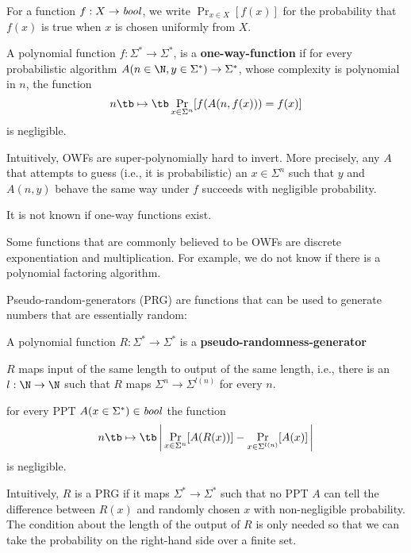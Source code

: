 \newcommand{\Prob}[2]{\mathop{\mathrm{Pr}}_{#1}[#2]}

\begin{notation}
For a function $f:X\to\mathit{bool}$, we write $\Prob{x\in X}{f(x)}$ for the probability that $f(x)$ is true when $x$ is chosen uniformly from $X$.
\end{notation}

\begin{definition}
 A polynomial function $f:\Sigma^*\to \Sigma^*$, is a \textbf{one-way-function} if for every probabilistic algorithm $A(n\in\N,y\in \Sigma^*)\to\Sigma^*$, whose complexity is polynomial in $n$, the function
 \[n\tb\mapsto\tb \Prob{x\in\Sigma^n}{f(A(n,f(x)))=f(x)}\]
 is negligible.
\end{definition}
Intuitively, OWFs are super-polynomially hard to invert.
More precisely, any $A$ that attempts to guess (i.e., it is probabilistic) an $x\in\Sigma^n$ such that $y$ and $A(n,y)$ behave the same way under $f$ succeeds with negligible probability.

\begin{example}
It is not known if one-way functions exist.

Some functions that are commonly believed to be OWFs are discrete exponentiation and multiplication.
For example, we do not know if there is a polynomial factoring algorithm.
\end{example}

Pseudo-random-generators (PRG) are functions that can be used to generate numbers that are essentially random:
\begin{definition}
 A polynomial function $R:\Sigma^*\to\Sigma^*$ is a \textbf{pseudo-randomness-generator}
 \begin{compactitem}
   \item $R$ maps input of the same length to output of the same length, i.e., there is an $l:\N\to\N$ such that $R$ maps $\Sigma^n\to\Sigma^{l(n)}$ for every $n$.
   \item for every PPT $A(x\in\Sigma^*)\in\mathit{bool}$ the function
  \[n \tb\mapsto \tb \left|\,\Prob{x\in\Sigma^n}{A(R(x))}-\Prob{x\in\Sigma^{l(n)}}{A(x)}\,\right|\]
  is negligible.
 \end{compactitem}
\end{definition}

Intuitively, $R$ is a PRG if it maps $\Sigma^*\to\Sigma^*$ such that no PPT $A$ can tell the difference between $R(x)$ and randomly chosen $x$ with non-negligible probability.
The condition about the length of the output of $R$ is only needed so that we can take the probability on the right-hand side over a finite set.

